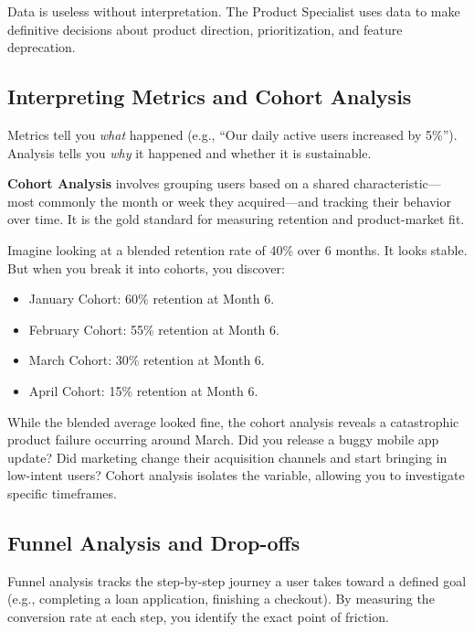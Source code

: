 Data is useless without interpretation. The Product Specialist uses data
to make definitive decisions about product direction, prioritization,
and feature deprecation.

\subsection{Interpreting Metrics and Cohort
Analysis}\label{interpreting-metrics-and-cohort-analysis}

Metrics tell you \emph{what} happened (e.g., ``Our daily active users
increased by 5\%''). Analysis tells you \emph{why} it happened and
whether it is sustainable.

\textbf{Cohort Analysis} involves grouping users based on a shared
characteristic---most commonly the month or week they acquired---and
tracking their behavior over time. It is the gold standard for measuring
retention and product-market fit.

Imagine looking at a blended retention rate of 40\% over 6 months. It
looks stable. But when you break it into cohorts, you discover:

\begin{itemize}
\tightlist
\item
  January Cohort: 60\% retention at Month 6.
\item
  February Cohort: 55\% retention at Month 6.
\item
  March Cohort: 30\% retention at Month 6.
\item
  April Cohort: 15\% retention at Month 6.
\end{itemize}

While the blended average looked fine, the cohort analysis reveals a
catastrophic product failure occurring around March. Did you release a
buggy mobile app update? Did marketing change their acquisition channels
and start bringing in low-intent users? Cohort analysis isolates the
variable, allowing you to investigate specific timeframes.

\subsection{Funnel Analysis and
Drop-offs}\label{funnel-analysis-and-drop-offs}

Funnel analysis tracks the step-by-step journey a user takes toward a
defined goal (e.g., completing a loan application, finishing a
checkout). By measuring the conversion rate at each step, you identify
the exact point of friction.

